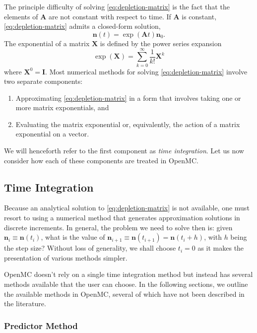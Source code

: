 \documentclass[3p,authoryear]{elsarticle}
\begin{document}
The principle difficulty of solving \cref{eq:depletion-matrix} is the fact that
the elements of $\mathbf{A}$ are not constant with respect to time. If
$\mathbf{A}$ is constant, \cref{eq:depletion-matrix} admits a closed-form
solution,
\begin{equation}
  \label{eq:constant-A}
  \mathbf{n}(t) = \exp \left (\mathbf{A} t \right ) \mathbf{n}_0.
\end{equation}
The exponential of a matrix $\mathbf{X}$ is defined by the power series
expansion
\begin{equation}
    \exp(\mathbf{X}) = \sum\limits_{k=0}^\infty \frac{1}{k!} \mathbf{X}^k
\end{equation}
where $\mathbf{X}^0 = \mathbf{I}$. Most numerical methods for solving
\cref{eq:depletion-matrix} involve two separate components:
\begin{enumerate}
  \item Approximating \cref{eq:depletion-matrix} in a form that involves taking
  one or more matrix exponentials, and
  \item Evaluating the matrix exponential or, equivalently, the action of a
  matrix exponential on a vector.
\end{enumerate}
We will henceforth refer to the first component as \emph{time integration}. Let
us now consider how each of these components are treated in OpenMC.

\subsection{Time Integration}
\label{sec:time_integration}

Because an analytical solution to \cref{eq:depletion-matrix} is not available,
one must resort to using a numerical method that generates approximation
solutions in discrete increments. In general, the problem we need to solve then
is: given $\mathbf{n}_i \equiv \mathbf{n}(t_i)$, what is the value of
$\mathbf{n}_{i+1} \equiv \mathbf{n}(t_{i+1}) = \mathbf{n}(t_i + h)$, with $h$
being the step size? Without loss of generality, we shall choose $t_i=0$ as it
makes the presentation of various methods simpler.

OpenMC doesn't rely on a single time integration method but instead has several
methods available that the user can choose. In the following sections, we
outline the available methods in OpenMC, several of which have not been
described in the literature.

\subsubsection{Predictor Method}
\end{document}
